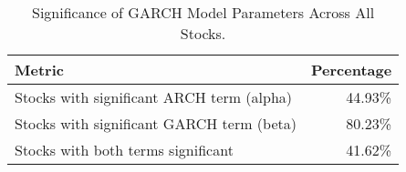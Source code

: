 \begin{table}
\caption{Significance of GARCH Model Parameters Across All Stocks.}
\label{tab:garch_summary}
\begin{tabular}{lr}
\toprule
Metric & Percentage \\
\midrule
Stocks with significant ARCH term (alpha) & 44.93\% \\
Stocks with significant GARCH term (beta) & 80.23\% \\
Stocks with both terms significant & 41.62\% \\
\bottomrule
\end{tabular}
\end{table}
